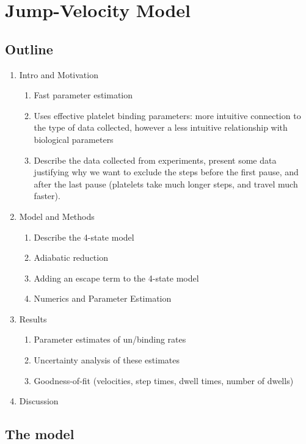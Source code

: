 
\chapter{Jump-Velocity Model}
\label{cha:jump-velocity-model}

\setcounter{section}{-1}
\section{Outline}
\label{sec:outline}

\begin{enumerate}
\item Intro and Motivation
  \begin{enumerate}
  \item Fast parameter estimation
  \item Uses effective platelet binding parameters: more intuitive
    connection to the type of data collected, however a less intuitive
    relationship with biological parameters
  \item Describe the data collected from experiments, present some
    data justifying why we want to exclude the steps before the first
    pause, and after the last pause (platelets take much longer steps,
    and travel much faster).
  \end{enumerate}
\item Model and Methods
  \begin{enumerate}
  \item Describe the 4-state model
  \item Adiabatic reduction
  \item Adding an escape term to the 4-state model
  \item Numerics and Parameter Estimation
  \end{enumerate}
\item Results
  \begin{enumerate}
  \item Parameter estimates of un/binding rates
  \item Uncertainty analysis of these estimates
  \item Goodness-of-fit (velocities, step times, dwell times, number
    of dwells)
  \end{enumerate}
\item Discussion
\end{enumerate}

\section{The model}
\label{sec:jv-model}

